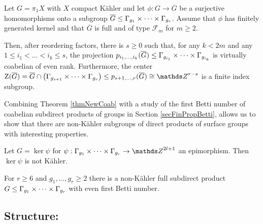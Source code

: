 \begin{theorem}
\label{thmNewCoab}
 Let $G=\pi_1 X$ with $X$ compact K\"ahler and let $\phi: G \rightarrow \overline{G}$ be a surjective homomorphisms onto a subgroup $\overline{G}\leq \Gamma_{g_1}\times \dots \times \Gamma_{g_r}$. Assume that $\phi$ has finitely generated kernel and that $\overline{G}$ is full and of type $\mathcal{F}_m$ for $m\geq 2$.
 
 Then, after reordering factors, there is $s\geq 0$ such that, for any $k< 2m$ and any $1\leq i_1 < \dots < i_k\leq s$, the projection $p_{i_1,\dots,i_k}(\overline{G})\leq \Gamma_{g_{i_1}}\times \dots \times \Gamma_{g_{i_k}}$ is virtually coabelian of even rank. Furthermore, the center $\mathrm{Z}(\overline{G})= \overline{G} \cap \left(\G_{g_{s+1}}\times \dots \times \G_{g_r}\right)\leq p_{s+1,\dots,r}(\overline{G})\cong \ZZ^{r-s}$ is a finite index subgroup. 
\end{theorem}

Combining Theorem \ref{thmNewCoab} with a study of the first Betti number of coabelian subdirect products of groups in Section \ref{secFinPropBetti}, allows us to show that there are non-K\"ahler subgroups of direct products of surface groups with interesting properties.

\begin{corollary}
\label{corNewCoabExs}
 Let $G=\ker \psi$ for $\psi: \G_{g_1}\times \dots\times \G_{g_r}\rightarrow \ZZ^{2l+1}$ an epimorphism. Then $\ker \psi$ is not K\"ahler.
\end{corollary}



\begin{corollary}
 For $r\geq 6$ and $g_1,\dots,g_r\geq 2$ there is a non-K\"ahler full subdirect product $G\leq \Gamma_{g_1}\times \dots \times \Gamma_{g_r}$ with even first Betti number.
 \label{corExEvenB1Intro}
\end{corollary}










\subsection*{Structure:} 


